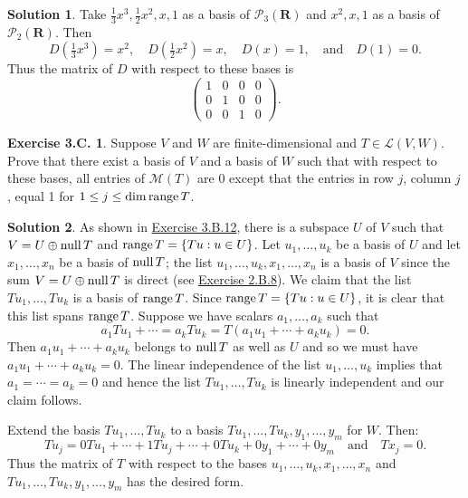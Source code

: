 \documentclass[12pt]{article}
\theoremstyle{definition}
\theoremstyle{exercise}
\newtheorem{exercise}{Exercise 3.C.}
\theoremstyle{solution}
\newtheorem*{solution}{Solution}
\newcommand{\poly}{\mathcal{P}}
\newcommand{\lmap}{\mathcal{L}}
\newcommand{\mat}{\mathcal{M}}
\newcommand{\Null}{\text{null\,}}
\newcommand{\Range}{\text{range\,}}
\newcommand{\quand}{\quad \text{and} \quad}
\newcommand{\R}{\mathbf{R}}
\begin{document}
\begin{solution}
    Take \( \tfrac{1}{3} x^3, \tfrac{1}{2} x^2, x, 1 \) as a basis of \( \poly_3(\R) \) and \( x^2, x, 1 \) as a basis of \( \poly_2(\R) \). Then
    \[
        D \left( \tfrac{1}{3} x^3 \right) = x^2, \quad D \left( \tfrac{1}{2} x^2 \right) = x, \quad D(x) = 1, \quand D(1) = 0.
    \]
    Thus the matrix of \( D \) with respect to these bases is
    \[
        \begin{pmatrix}
            1 & 0 & 0 & 0 \\
            0 & 1 & 0 & 0 \\
            0 & 0 & 1 & 0
        \end{pmatrix}.
    \]
\end{solution}

\begin{exercise}
\label{ex:3}
    Suppose \( V \) and \( W \) are finite-dimensional and \( T \in \lmap(V, W) \). Prove that there exist a basis of \( V \) and a basis of \( W \) such that with respect to these bases, all entries of \( \mat(T) \) are 0 except that the entries in row \( j \), column \( j \), equal 1 for \( 1 \leq j \leq \dim \Range T \).
\end{exercise}

\begin{solution}
    As shown in \href{https://lew98.github.io/Mathematics/LADR_Section_3_B_Exercises.pdf}{Exercise 3.B.12}, there is a subspace \( U \) of \( V \) such that \( V = U \oplus \Null T \) and \( \Range T = \{ Tu : u \in U \} \). Let \( u_1, \ldots, u_k \) be a basis of \( U \) and let \( x_1, \ldots, x_n \) be a basis of \( \Null T \); the list \( u_1, \ldots, u_k, x_1, \ldots, x_n \) is a basis of \( V \) since the sum \( V = U \oplus \Null T \) is direct (see \href{https://lew98.github.io/Mathematics/LADR_Section_2_B_Exercises.pdf}{Exercise 2.B.8}). We claim that the list \( Tu_1, \ldots, Tu_k \) is a basis of \( \Range T \). Since \( \Range T = \{ Tu : u \in U \} \), it is clear that this list spans \( \Range T \). Suppose we have scalars \( a_1, \ldots, a_k \) such that
    \[
        a_1 Tu_1 + \cdots = a_k Tu_k = T(a_1 u_1 + \cdots + a_k u_k) = 0.
    \]
    Then \( a_1 u_1 + \cdots + a_k u_k \) belongs to \( \Null T \) as well as \( U \) and so we must have \( a_1 u_1 + \cdots + a_k u_k = 0 \). The linear independence of the list \( u_1, \ldots, u_k \) implies that \( a_1 = \cdots = a_k = 0 \) and hence the list \( Tu_1, \ldots, Tu_k \) is linearly independent and our claim follows.

    Extend the basis \( Tu_1, \ldots, Tu_k \) to a basis \( Tu_1, \ldots, Tu_k, y_1, \ldots, y_m \) for \( W \). Then:
    \[
        Tu_j = 0 Tu_1 + \cdots + 1 Tu_j + \cdots + 0 Tu_k + 0 y_1 + \cdots + 0 y_m \quand Tx_j = 0.
    \]
    Thus the matrix of \( T \) with respect to the bases \( u_1, \ldots, u_k, x_1, \ldots, x_n \) and \( Tu_1, \ldots, Tu_k, y_1, \ldots, y_m \) has the desired form.
\end{solution}
\end{document}
